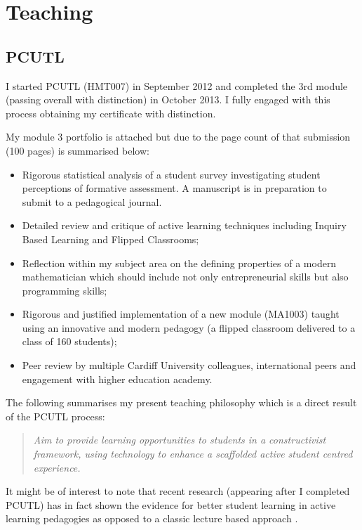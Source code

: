 \documentclass{article}
\begin{document}
\section{Teaching}\label{sec:teaching}

\subsection{PCUTL}

I started PCUTL (HMT007) in September 2012 and completed the 3rd module (passing overall with distinction) in October 2013. I fully engaged with this process obtaining my certificate with distinction.

My module 3 portfolio is attached but due to the page count of that submission (100 pages) is summarised below:

\begin{itemize}
    \item Rigorous statistical analysis of a student survey investigating student perceptions of formative assessment. A manuscript is in preparation to submit to a pedagogical journal.
    \item Detailed review and critique of active learning techniques including Inquiry Based Learning and Flipped Classrooms;
    \item Reflection within my subject area on the defining properties of a modern mathematician which should include not only entrepreneurial skills but also programming skills;
    \item Rigorous and justified implementation of a new module (MA1003) taught using an innovative and modern pedagogy (a flipped classroom delivered to a class of 160 students);
    \item Peer review by multiple Cardiff University colleagues, international peers and engagement with higher education academy.
\end{itemize}

The following summarises my present teaching philosophy which is a direct result of the PCUTL process:

\begin{quote}
   \textit{Aim to provide learning opportunities to students in a constructivist framework, using technology to enhance a scaffolded active student centred experience.}
\end{quote}

It might be of interest to note that recent research (appearing after I completed PCUTL) has in fact shown the evidence for better student learning in active learning pedagogies as opposed to a classic lecture based approach \cite{freeman_active_2014}.
\end{document}

